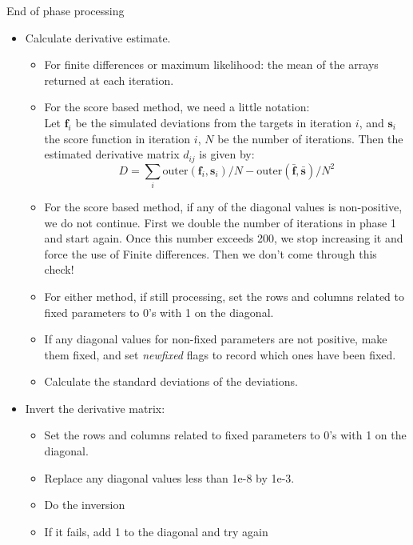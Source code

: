 \documentclass[12pt,a4paper]{article}
\makeatletter
\renewcommand{\=}{\,=\,}
\newcommand{\+}{\,+\,}
\newcommand{\nnm}[1]{\textsf{\small\textit{#1}}}
\renewcommand{\subsubsection}{\@startsection{subsubsection}{3}
                {0pt}{0.5\baselineskip}{0.3\baselineskip}
                {\it\sffamily} }
\makeatother
\begin{document}
\subsubsection{End of phase processing}
\begin{itemize}
\item Calculate derivative estimate.
\begin{itemize}
\item
For finite differences or maximum likelihood: the mean of the arrays
returned at each iteration.
\item For the score based method, we need a little notation:\\
  Let $\mathbf{f}_i$ be the simulated deviations from the targets in
  iteration $i$, and $\mathbf{s}_i$ the score function in iteration
  $i$, $N$ be the number of iterations. Then the estimated derivative
  matrix $d_{ij}$ is given by:
$$
D = \sum_i \mathrm{outer}(\mathbf{f}_i,\mathbf{s}_i)/ N -
\mathrm{outer}(\bar{\mathbf{f}}, \bar{\mathbf{s}})/N^2
$$
\item For the score based method, if any of the diagonal values is
  non-positive, we do not continue. First we double the number of
  iterations in phase 1 and start again. Once this number exceeds 200,
  we stop increasing it and force the use of Finite differences. Then
  we don't come through this check!
\item
For either method, if still processing, set the rows and columns related to fixed
parameters to 0's with 1 on the diagonal.
\item
If any diagonal values for non-fixed parameters are not positive, make
them fixed, and set \nnm{newfixed} flags to record which ones have
been fixed.
\item
Calculate the standard deviations of the deviations.
\end{itemize}
\item Invert the derivative matrix:
\begin{itemize}
\item
  Set the rows and columns related to fixed parameters to 0's with 1 on the diagonal.
\item
  Replace any diagonal values less than 1e-8 by 1e-3.
\item
 Do the inversion
\item
If it fails, add 1 to the diagonal and try again
\end{itemize}


\end{itemize}
\end{document}
